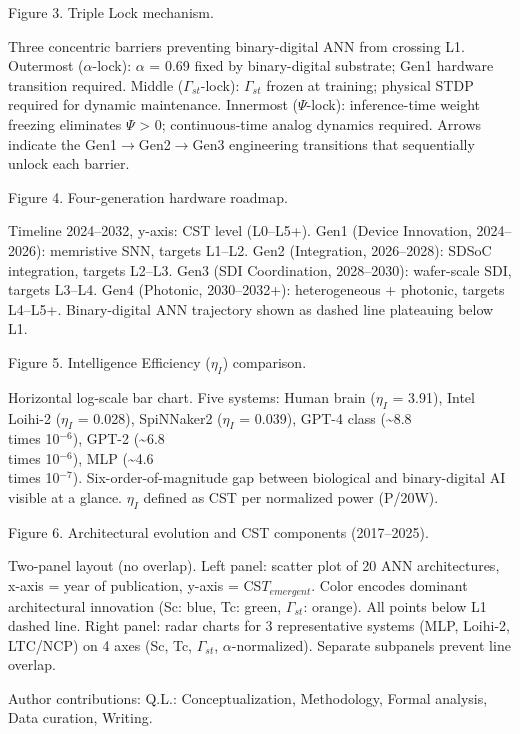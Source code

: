\documentclass[a4paper,12pt]{article}
\begin{document}
Figure 3. Triple Lock mechanism.

Three concentric barriers preventing binary-digital ANN from crossing L1. Outermost ($\alpha$-lock): $\alpha$ = 0.69 fixed by binary-digital substrate; Gen1 hardware transition required. Middle ($\Gamma_{st}$-lock): $\Gamma_{st}$ frozen at training; physical STDP required for dynamic maintenance. Innermost ($\Psi$-lock): inference-time weight freezing eliminates $\Psi$ > 0; continuous-time analog dynamics required. Arrows indicate the Gen1$\rightarrow$Gen2$\rightarrow$Gen3 engineering transitions that sequentially unlock each barrier.

Figure 4. Four-generation hardware roadmap.

Timeline 2024--2032, y-axis: CST level (L0--L5+). Gen1 (Device Innovation, 2024--2026): memristive SNN, targets L1--L2. Gen2 (Integration, 2026--2028): SDSoC integration, targets L2--L3. Gen3 (SDI Coordination, 2028--2030): wafer-scale SDI, targets L3--L4. Gen4 (Photonic, 2030--2032+): heterogeneous + photonic, targets L4--L5+. Binary-digital ANN trajectory shown as dashed line plateauing below L1.

Figure 5. Intelligence Efficiency ($\eta_{I}$) comparison.

Horizontal log-scale bar chart. Five systems: Human brain ($\eta_{I}$ = 3.91), Intel Loihi-2 ($\eta_{I}$ = 0.028), SpiNNaker2 ($\eta_{I}$ = 0.039), GPT-4 class (\textasciitilde{}8.8 \\times 10$^{-6}$), GPT-2 (\textasciitilde{}6.8 \\times 10$^{-6}$), MLP (\textasciitilde{}4.6 \\times 10$^{-7}$). Six-order-of-magnitude gap between biological and binary-digital AI visible at a glance. $\eta_{I}$ defined as CST per normalized power (P/20W).

Figure 6. Architectural evolution and CST components (2017--2025).

Two-panel layout (no overlap). Left panel: scatter plot of 20 ANN architectures, x-axis = year of publication, y-axis = CS$T_{emergent}$. Color encodes dominant architectural innovation (Sc: blue, Tc: green, $\Gamma_{st}$: orange). All points below L1 dashed line. Right panel: radar charts for 3 representative systems (MLP, Loihi-2, LTC/NCP) on 4 axes (Sc, Tc, $\Gamma_{st}$, $\alpha$-normalized). Separate subpanels prevent line overlap.

Author contributions: Q.L.: Conceptualization, Methodology, Formal analysis, Data curation, Writing.
\end{document}
